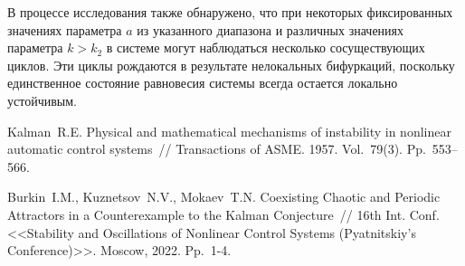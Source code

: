 В процессе исследования также обнаружено, что при некоторых фиксированных значениях параметра $a$  из указанного диапазона и различных значениях параметра    $k>k_2$ в системе могут наблюдаться несколько сосуществующих циклов. Эти циклы рождаются в результате нелокальных бифуркаций, поскольку единственное состояние равновесия системы всегда остается локально устойчивым.

  


%



\begin{thebibliography}{9} %
 Kalman~R.E. Physical and mathematical mechanisms of instability in nonlinear automatic control systems~// Transactions of ASME. 1957. Vol.~79(3). Pp.~553–566.

 Burkin~I.M., Kuznetsov~N.V., Mokaev~T.N. Coexisting Chaotic and Periodic Attractors in a Counterexample to the Kalman Conjecture~// 16th Int. Conf. <<Stability and Oscillations of Nonlinear Control Systems (Pyatnitskiy's Conference)>>. Moscow, 2022. Pp.~1-4.




\end{thebibliography}

